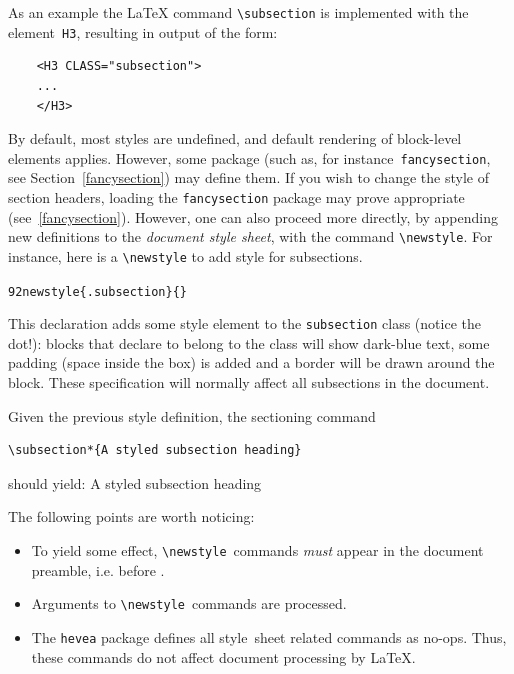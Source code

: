 As an example the \LaTeX{} command \verb+\subsection+
 is implemented with the element~\verb+H3+, resulting in
\html{} output of the form:
\begin{verbatim}
    <H3 CLASS="subsection">
    ...
    </H3>
\end{verbatim}
By default, most styles are undefined, and default rendering of
block-level elements applies. However, some package (such as, for
instance~\texttt{fancysection}, see Section~\ref{fancysection}) may
define them.
%
If you wish to change the style of section headers, loading the
\texttt{fancysection} package may prove appropriate (see~\ref{fancysection}).
However, one can also proceed more directly, by appending new
definitions to the \emph{document style
sheet}, with the command \verb+\newstyle+.
For instance, here is a \verb+\newstyle+ to add style for subsections.
\begin{alltt}
  \char92newstyle\{.subsection\}\{\stylex\}
\end{alltt}
This declaration adds some style element to the
\texttt{subsection} class (notice the dot!):
blocks that declare to belong to the class
will show dark-blue text, some padding
(space inside the box) is added and a border will be drawn around the block.
These specification will normally affect all subsections in the document.
\begin{htmlonly}
Given the previous style definition, the sectioning command
\begin{verbatim}
\subsection*{A styled subsection heading}
\end{verbatim}
should yield:
A styled subsection heading
\end{htmlonly}

The following points are worth noticing:
\begin{itemize}
\item
To yield some effect, \verb+\newstyle+~commands \emph{must} appear
in the document preamble, i.e. before \verb++.
\item
Arguments to \verb+\newstyle+~commands are processed.
\item The \texttt{hevea} package defines all style~sheet related
commands as no-ops. Thus, these commands do not affect
document processing by \LaTeX{}.
\end{itemize}



